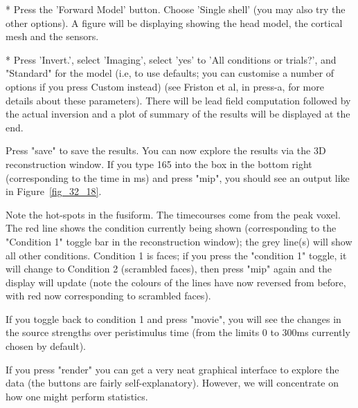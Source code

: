 * Press the 'Forward Model' button. Choose 'Single shell' (you may also try the other options). A figure will be displaying showing the head model, the cortical mesh and the sensors. 


* Press 'Invert.', select 'Imaging', select 'yes' to 'All conditions or trials?', and "Standard" for the model (i.e, to use defaults; you can customise a number of options if you press Custom instead) (see Friston et al, in press-a, for more details about these parameters). There will be lead field computation followed by the actual inversion and a plot of summary of the results will be displayed at the end. 

Press "save" to save the results. You can now explore the results via the 3D reconstruction window. If you type 165 into the box in the bottom right (corresponding to the time in ms) and press "mip", you should see an output like in Figure~\ref{fig_32_18}.

Note the hot-spots in the fusiform. The timecourses come from the peak voxel. The red line shows the condition currently being shown (corresponding to the "Condition 1" toggle bar in the reconstruction window); the grey line(s) will show all other conditions. Condition 1 is faces; if you press the "condition 1" toggle, it will change to Condition 2 (scrambled faces), then press "mip" again and the display will update (note the colours of the lines have now reversed from before, with red now corresponding to scrambled faces).

If you toggle back to condition 1 and press "movie", you will see the changes in the source strengths over peristimulus time (from the limits 0 to 300ms currently chosen by default).

If you press "render" you can get a very neat graphical interface to explore the data (the buttons are fairly self-explanatory). However, we will concentrate on how one might perform statistics.


